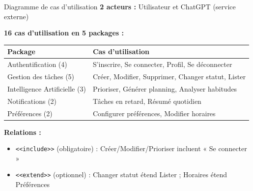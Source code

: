 \documentclass[aspectratio=169, 10pt]{beamer}
\begin{document}
\begin{frame}{Diagramme de cas d'utilisation}
\small
\textbf{\textcolor{secondary}{2 acteurs :}} Utilisateur et ChatGPT (service externe)
\vspace{0.2cm}

\textbf{\textcolor{secondary}{16 cas d'utilisation en 5 packages :}}
\vspace{0.1cm}

\footnotesize
\begin{tabular}{l l}
\toprule
\textbf{Package} & \textbf{Cas d'utilisation} \\
\midrule
\textcolor{secondary}{Authentification (4)} & S'inscrire, Se connecter, Profil, Se déconnecter \\
\rowcolor{light}
\textcolor{success}{Gestion des tâches (5)} & Créer, Modifier, Supprimer, Changer statut, Lister \\
\textcolor{accent}{Intelligence Artificielle (3)} & Prioriser, Générer planning, Analyser habitudes \\
\rowcolor{light}
\textcolor{warning}{Notifications (2)} & Tâches en retard, Résumé quotidien \\
\textcolor{danger}{Préférences (2)} & Configurer préférences, Modifier horaires \\
\bottomrule
\end{tabular}

\vspace{0.3cm}
\small\textbf{\textcolor{secondary}{Relations :}}
\begin{itemize}\small
    \item \texttt{<<include>>} (obligatoire) : Créer/Modifier/Prioriser incluent « Se connecter »
    \item \texttt{<<extend>>} (optionnel) : Changer statut étend Lister ; Horaires étend Préférences
\end{itemize}
\end{frame}
\end{document}
